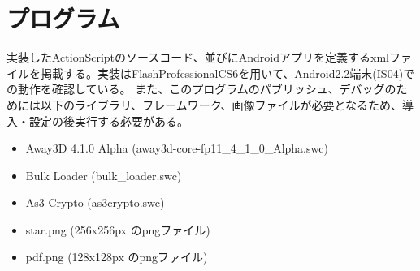 \chapter{プログラム}
実装したActionScriptのソースコード、並びにAndroidアプリを定義するxmlファイルを掲載する。実装はFlashProfessionalCS6を用いて、Android2.2端末(IS04)での動作を確認している。
また、このプログラムのパブリッシュ、デバッグのためには以下のライブラリ、フレームワーク、画像ファイルが必要となるため、導入・設定の後実行する必要がある。
\begin{itemize}
\item Away3D 4.1.0 Alpha (away3d-core-fp11\_4\_1\_0\_Alpha.swc)\cite{away3d}
\item Bulk Loader (bulk\_loader.swc)\cite{bulkloader}
\item As3 Crypto (as3crypto.swc)\cite{as3crypto}
\item star.png (256x256px のpngファイル)
\item pdf.png (128x128px のpngファイル)
\end{itemize}

